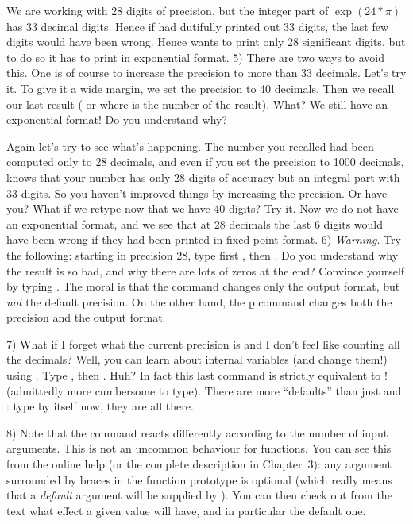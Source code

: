 We are working with 28 digits of precision, but the integer part of
$\exp(24*\pi)$ has 33 decimal digits. Hence if  had dutifully printed out 33
digits, the last few digits would have been wrong. Hence  wants to print only
28 significant digits, but to do so it has to print in exponential format.
\smallskip
%
5) There are two ways to avoid this. One is of course to increase the precision
to more than 33 decimals. Let's try it. To give it a wide margin, we set the
precision to 40 decimals. Then we recall our last result (\kbd{\%}
or  where  is the number of the result). What? We still have
an exponential format! Do you understand why?

Again let's try to see what's happening. The number you recalled had been
computed only to 28 decimals, and even if you set the precision to 1000
decimals,  knows that your number has only 28 digits of accuracy but an
integral part with 33 digits. So you haven't improved things by increasing
the precision. Or have you? What if we retype  now that we
have 40 digits? Try it. Now we do not have an exponential format, and we see
that at 28 decimals the last 6 digits would have been wrong if they had been
printed in fixed-point format.
\smallskip
%
6) {\it Warning\/}. Try the following: starting in precision 28, type first
, then . Do you understand why
the result is so bad, and why there are lots of zeros at the end?  Convince
yourself by typing . The moral is that the
 command changes only the output format, but {\it not\/}
the default precision.  On the other hand, the \b{p} command changes both the
precision and the output format.

7) What if I forget what the current precision is and I don't feel like
counting all the decimals? Well, you can learn about  internal variables
(and change them!) using . Type ,
then . Huh? In fact this last command is
strictly equivalent to ! (admittedly more cumbersome to type).
There are more ``defaults'' than just  and :
type  by itself now, they are all there.

8) Note that the  command reacts differently according to the
number of input arguments. This is not an uncommon behaviour for  functions.
You can see this from the online help (or the complete description in
Chapter~3): any argument surrounded by braces \kbd{\obr\cbr} in the function
prototype is optional (which really means that a {\it default} argument will be
supplied by ). You can then check out from the text what effect a given value
will have, and in particular the default one.

